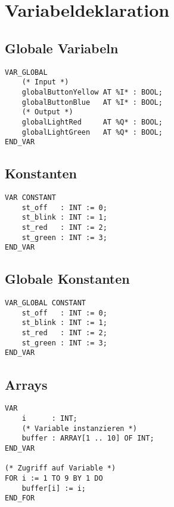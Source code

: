


\section{Variabeldeklaration}

\subsection{Globale Variabeln}
\begin{lstlisting}
VAR_GLOBAL
    (* Input *)
    globalButtonYellow AT %I* : BOOL;
    globalButtonBlue   AT %I* : BOOL;
    (* Output *)
    globalLightRed     AT %Q* : BOOL;
    globalLightGreen   AT %Q* : BOOL;
END_VAR
\end{lstlisting}

\subsection{Konstanten}
\begin{lstlisting}
VAR CONSTANT
    st_off   : INT := 0;
    st_blink : INT := 1;
    st_red   : INT := 2;
    st_green : INT := 3;
END_VAR
\end{lstlisting}

\subsection{Globale Konstanten}
\begin{lstlisting}
VAR_GLOBAL CONSTANT
    st_off   : INT := 0;
    st_blink : INT := 1;
    st_red   : INT := 2;
    st_green : INT := 3;
END_VAR
\end{lstlisting}

\subsection{Arrays}
\begin{lstlisting}
VAR
    i      : INT;
    (* Variable instanzieren *)
    buffer : ARRAY[1 .. 10] OF INT;
END_VAR

(* Zugriff auf Variable *)
FOR i := 1 TO 9 BY 1 DO
    buffer[i] := i;
END_FOR
\end{lstlisting}
